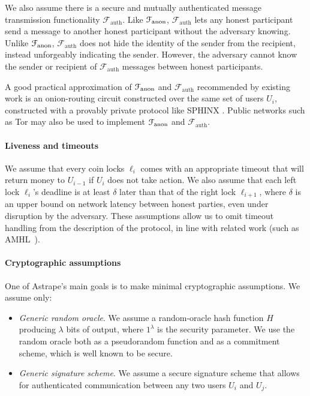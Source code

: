 \documentclass[USenglish,oneside,twocolumn]{article}
\begin{document}
\newcommand{\Fauth}{\mathcal{F}_\mathrm{auth}}


We also assume there is a secure and mutually authenticated message transmission functionality $\Fauth$. Like $\mathcal{F}_\mathrm{anon}$, $\Fauth$ lets any honest participant send a message to another honest participant without the adversary knowing. Unlike $\mathcal{F}_\mathrm{anon}$, $\Fauth$ does not hide the identity of the sender from the recipient, instead unforgeably indicating the sender. However, the adversary cannot know the sender or recipient of $\Fauth$ messages between honest participants.

A good practical approximation of $\mathcal{F}_\mathrm{anon}$ and $\Fauth$ recommended by existing work \cite{malavolta2017concurrency,malavolta2019anonymous} is an onion-routing circuit constructed over the same set of users $U_i$, constructed with a provably private protocol like SPHINX \cite{danezis2009sphinx}. Public networks such as Tor may also be used to implement $\mathcal{F}_\mathrm{anon}$ and $\Fauth$.

\paragraph*{Liveness and timeouts} We assume that every coin locks $\ell_i$ comes with an appropriate timeout that will return money to $U_{i-1}$ if $U_i$ does not take action. We also assume that each left lock $\ell_i$'s deadline is at least $\delta$ later than that of the right lock $\ell_{i+1}$, where $\delta$ is an upper bound on network latency between honest parties, even under disruption by the adversary. These assumptions allow us to omit timeout handling from the description of the protocol, in line with related work (such as AMHL~\cite{malavolta2019anonymous}).


\paragraph*{Cryptographic assumptions} One of Astrape's main goals is to make minimal cryptographic assumptions. We assume only:

\begin{itemize}
    \item \emph{Generic random oracle}. We assume a random-oracle hash function $H$ producing $\lambda$ bits of output, where $1^\lambda$ is the security parameter. We use the random oracle both as a pseudorandom function and as a commitment scheme, which is well known \cite{camenisch2018wonderful} to be secure.
    \item \emph{Generic signature scheme}. We assume a secure signature scheme that allows for authenticated communication between any two users $U_i$ and $U_j$.
\end{itemize}
\end{document}
